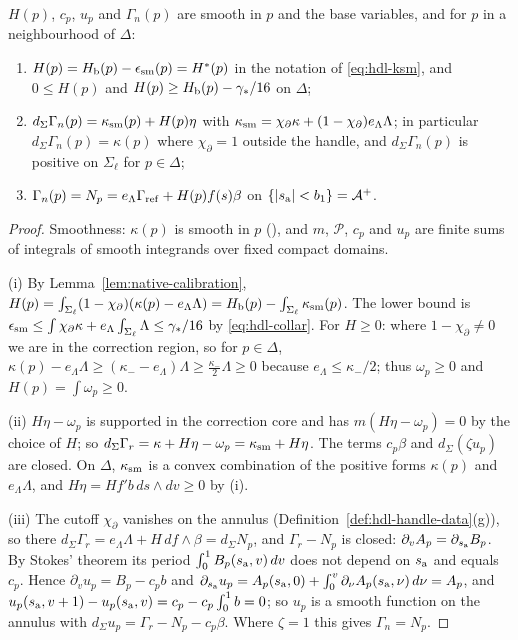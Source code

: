 \begin{proposition}\label{prop:native-normalization}
$H(p)$, $c_p$, $u_p$ and $\Gamma_n(p)$ are smooth in $p$ and the base variables, and for $p$ in a neighbourhood of $\Delta$:
\begin{enumerate}[label=(\roman*)]
\item $H(p)=H_{\mathrm b}(p)-\epsilon_{\rm sm}(p)=H^*(p)$ in the notation of \eqref{eq:hdl-ksm}, and
 $0\le H(p)$ and $H(p)\ge H_{\mathrm b}(p)-\gamma_*/16$ on $\Delta$;
\item $d_\Sigma\Gamma_n(p)=\kappa_{\rm sm}(p)+H(p)\eta$ with $\kappa_{\rm sm}=\chi_\partial\kappa+(1-\chi_\partial)e_\Lambda\Lambda$; in particular
 $d_\Sigma\Gamma_n(p)=\kappa(p)$ where $\chi_\partial=1$ outside the handle, and $d_\Sigma\Gamma_n(p)$ is positive on $\Sigma_\ell$ for
 $p\in\Delta$;
\item $\Gamma_n(p)=N_p=e_\Lambda\Gamma_{\rm ref}+H(p)f(s)\beta$ on $\{|s_{\rm a}|<b_1\}=\mathcal A^+$.
\end{enumerate}
\end{proposition}

\begin{proof}
Smoothness: $\kappa(p)$ is smooth in $p$ (), and $m$, $\mathcal P$, $c_p$ and $u_p$ are finite
sums of integrals of smooth integrands over fixed compact domains.

(i) By Lemma~\ref{lem:native-calibration},
$H(p)=\int_{\Sigma_\ell}(1-\chi_\partial)(\kappa(p)-e_\Lambda\Lambda)=H_{\mathrm b}(p)-\int_{\Sigma_\ell}\kappa_{\rm sm}(p)$. The lower bound
is $\epsilon_{\rm sm}\le\int\chi_\partial\kappa+e_\Lambda\int_{\Sigma_\ell}\Lambda\le\gamma_*/16$ by \eqref{eq:hdl-collar}. For
$H\ge0$: where $1-\chi_\partial\ne0$ we are in the correction region, so for $p\in\Delta$,
$\kappa(p)-e_\Lambda\Lambda\ge(\kappa_--e_\Lambda)\Lambda\ge\frac{\kappa_-}2\Lambda\ge0$ because $e_\Lambda\le\kappa_-/2$; thus
$\omega_p\ge0$ and $H(p)=\int\omega_p\ge0$.

(ii) $H\eta-\omega_p$ is supported in the correction core and has $m(H\eta-\omega_p)=0$ by the choice of $H$; so
$d_\Sigma\Gamma_r=\kappa+H\eta-\omega_p=\kappa_{\rm sm}+H\eta$. The terms $c_p\beta$ and $d_\Sigma(\zeta u_p)$ are closed. On
$\Delta$, $\kappa_{\rm sm}$ is a convex combination of the positive forms $\kappa(p)$ and $e_\Lambda\Lambda$, and
$H\eta=Hf'b\,ds\wedge dv\ge0$ by (i).

(iii) The cutoff $\chi_\partial$ vanishes on the annulus (Definition~\ref{def:hdl-handle-data}(g)), so there
$d_\Sigma\Gamma_r=e_\Lambda\Lambda+H\,df\wedge\beta=d_\Sigma N_p$, and $\Gamma_r-N_p$ is closed: $\partial_vA_p=\partial_{s_{\rm
a}}B_p$. By Stokes' theorem its period $\int_0^1B_p(s_{\rm a},v)\,dv$ does not depend on $s_{\rm a}$ and equals $c_p$. Hence
$\partial_vu_p=B_p-c_pb$ and $\partial_{s_{\rm a}}u_p=A_p(s_{\rm a},0)+\int_0^v\partial_\nu A_p(s_{\rm a},\nu)\,d\nu=A_p$, and
$u_p(s_{\rm a},v+1)-u_p(s_{\rm a},v)=c_p-c_p\int_0^1b=0$; so $u_p$ is a smooth function on the annulus with $d_\Sigma
u_p=\Gamma_r-N_p-c_p\beta$. Where $\zeta=1$ this gives $\Gamma_n=N_p$.
\end{proof}

